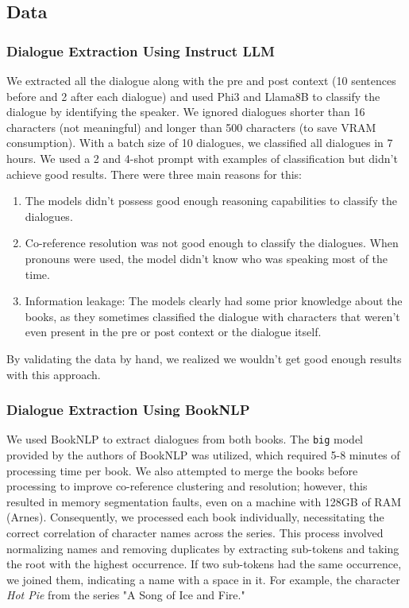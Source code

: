 \documentclass[fleqn,moreauthors,10pt]{ds_report}
\begin{document}
\subsection*{Data}


\subsubsection*{Dialogue Extraction Using Instruct LLM}

We extracted all the dialogue along with the pre and post context (10 sentences before and 2 after each dialogue) and used Phi3 and Llama8B to classify the dialogue by identifying the speaker. We ignored dialogues shorter than 16 characters (not meaningful) and longer than 500 characters (to save VRAM consumption). With a batch size of 10 dialogues, we classified all  dialogues in 7 hours. We used a 2 and 4-shot prompt with examples of classification but didn't achieve good results. There were three main reasons for this:

\begin{enumerate}
    \item The models didn't possess good enough reasoning capabilities to classify the dialogues.
    \item Co-reference resolution was not good enough to classify the dialogues. When pronouns were used, the model didn't know who was speaking most of the time.
    \item Information leakage: The models clearly had some prior knowledge about the books, as they sometimes classified the dialogue with characters that weren't even present in the pre or post context or the dialogue itself.
\end{enumerate}

By validating the data by hand, we realized we wouldn't get good enough results with this approach.


\subsubsection*{Dialogue Extraction Using BookNLP}

We used BookNLP to extract dialogues from both books. The \texttt{big} model provided by the authors of BookNLP was utilized, which required 5-8 minutes of processing time per book. We also attempted to merge the books before processing to improve co-reference clustering and resolution; however, this resulted in memory segmentation faults, even on a machine with 128GB of RAM (Arnes). Consequently, we processed each book individually, necessitating the correct correlation of character names across the series. This process involved normalizing names and removing duplicates by extracting sub-tokens and taking the root with the highest occurrence. If two sub-tokens had the same occurrence, we joined them, indicating a name with a space in it. For example, the character \textit{Hot Pie} from the series "A Song of Ice and Fire."
\end{document}
